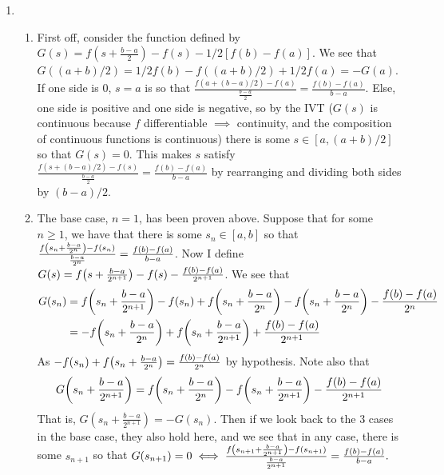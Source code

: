 \documentclass[12pt]{article}
\theoremstyle{definition}
\theoremstyle{remark}
\begin{document}
\begin{enumerate}[leftmargin=\labelsep]
		\item
		\begin{enumerate}[label=(\alph*)]
			\item 
			First off, consider the function defined by $G(s)=f(s+\frac{b-a}2)-f(s)-1/2[f(b)-f(a)]$. We see that $G((a+b)/2)=1/2f(b)-f((a+b)/2)+1/2f(a)=-G(a)$. 
			If one side is $0$, $s = a$ is so that $\frac{f(a+(b-a)/2)-f(a)}{\frac{b-a}2} = \frac{f(b)-f(a)}{b-a}$. Else, one side is positive and one side is negative, so by the IVT ($G(s)$ is continuous because $f$ differentiable $\implies$ continuity, and the composition of continuous functions is continuous) there is some $s \in [a, (a+b)/2]$ so that $G(s) = 0$. This makes $s$ satisfy $\frac{f(s+(b-a)/2)-f(s)}{\frac{b-a}2} = \frac{f(b)-f(a)}{b-a}$ by rearranging and dividing both sides by $(b-a)/2$.
			\item 
			The base case, $n=1$, has been proven above. Suppose that for some $n \geq 1$, we have that there is some $s_n \in [a, b]$ so that $\frac{f\qty(s_n+\frac{b-a}{2^n})-f\qty(s_n)}{\frac{b-a}{2^n}} = \frac{f\qty(b)-f\qty(a)}{b-a}$.
			Now I define $G(s) = f\qty(s+\frac{b-a}{2^{n+1}})-f\qty(s)-\frac{f\qty(b)-f\qty(a)}{2^{n+1}}$. We see that 
			\begin{align*}
				G(s_n) &= f\qty(s_n+\frac{b-a}{2^{n+1}})-f\qty(s_n)+f\qty(s_n+\frac{b-a}{2^{n}})-f\qty(s_n+\frac{b-a}{2^{n}})-\frac{f\qty(b)-f\qty(a)}{2^n}
				\\&= -f\qty(s_n+\frac{b-a}{2^n})+f\qty(s_n+\frac{b-a}{2^{n+1}})+\frac{f\qty(b)-f\qty(a)}{2^{n+1}}
			\end{align*}
			As $-f\qty(s_n)+f\qty(s_n+\frac{b-a}{2^{n}}) = \frac{f\qty(b)-f\qty(a)}{2^n}$ by hypothesis. Note also that
			\begin{align*}
				G\qty(s_n+\frac{b-a}{2^{n+1}}) = f\qty(s_n+\frac{b-a}{2^n})-f\qty(s_n+\frac{b-a}{2^{n+1}})-\frac{f\qty(b)-f\qty(a)}{2^{n+1}}
			\end{align*}
			That is, $G(s_n+\frac{b-a}{2^{n+1}}) = -G(s_n)$. Then if we look back to the 3 cases in the base case, they also hold here, and we see that in any case, there is some $s_{n+1}$ so that $G(s_{n+1}) = 0 \iff \frac{f\qty(s_{n+1} + \frac{b-a}{2^{n+1}})-f\qty(s_{n+1})}{\frac{b-a}{2^{n+1}}} = \frac{f\qty(b)-f\qty(a)}{b-a}.$
			

\end{enumerate}
\end{enumerate}
\end{document}
